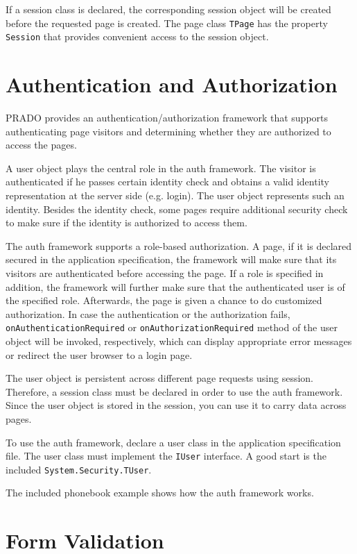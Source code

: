 \documentclass{book}
\begin{document}
If a session class is declared, the corresponding session object
will be created before the requested page is created. The page
class \verb|TPage| has the property \verb|Session| that provides
convenient access to the session object.


\section{Authentication and Authorization}

PRADO provides an authentication/authorization framework that
supports authenticating page visitors and determining whether they
are authorized to access the pages.

A user object plays the central role in the auth framework. The
visitor is authenticated if he passes certain identity check and
obtains a valid identity representation at the server side (e.g.
login). The user object represents such an identity. Besides the
identity check, some pages require additional security check to
make sure if the identity is authorized to access them.

The auth framework supports a role-based authorization. A page, if
it is declared secured in the application specification, the
framework will make sure that its visitors are authenticated
before accessing the page. If a role is specified in addition, the
framework will further make sure that the authenticated user is of
the specified role. Afterwards, the page is given a chance to do
customized authorization. In case the authentication or the
authorization fails, \verb|onAuthenticationRequired| or
\verb|onAuthorizationRequired| method of the user object will be
invoked, respectively, which can display appropriate error
messages or redirect the user browser to a login page.

The user object is persistent across different page requests using
session. Therefore, a session class must be declared in order to
use the auth framework. Since the user object is stored in the
session, you can use it to carry data across pages.

To use the auth framework, declare a user class in the application
specification file. The user class must implement the \verb|IUser|
interface. A good start is the included
\verb|System.Security.TUser|.

The included phonebook example shows how the auth framework works.


\section{Form Validation}
\end{document}

